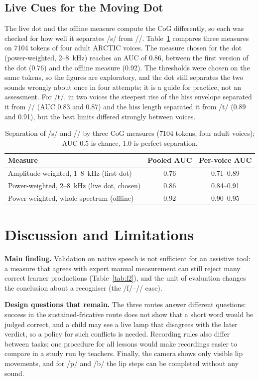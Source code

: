\documentclass[engproc,article,submit,moreauthors]{Definitions/mdpi}
\newcommand{\ipa}[1]{/#1/}
\begin{document}
\subsection{Live Cues for the Moving Dot}
The live dot and the offline measure compute the CoG differently, so each was checked for how well it separates \ipa{s} from \ipa{\textesh}. Table~\ref{tab:cog} compares three measures on 7104 tokens of four adult ARCTIC voices. The measure chosen for the dot (power-weighted, 2--8~kHz) reaches an AUC of 0.86, between the first version of the dot (0.76) and the offline measure (0.92). The thresholds were chosen on the same tokens, so the figures are exploratory, and the dot still separates the two sounds wrongly about once in four attempts: it is a guide for practice, not an assessment. For \ipa{t\textesh}, in two voices the steepest rise of the hiss envelope separated it from \ipa{\textesh} (AUC 0.83 and 0.87) and the hiss length separated it from \ipa{t} (0.89 and 0.91), but the best limits differed strongly between voices.

\begin{table}[!t]
\caption{Separation of \ipa{s} and \ipa{\textesh} by three CoG measures (7104 tokens, four adult voices); AUC 0.5 is chance, 1.0 is perfect separation.\label{tab:cog}}
\small
\begin{tabularx}{\textwidth}{Xcc}
\toprule
\textbf{Measure} & \textbf{Pooled AUC} & \textbf{Per-voice AUC}\\
\midrule
Amplitude-weighted, 1--8~kHz (first dot) & 0.76 & 0.71--0.89\\
Power-weighted, 2--8~kHz (live dot, chosen) & 0.86 & 0.84--0.91\\
Power-weighted, whole spectrum (offline) & 0.92 & 0.90--0.95\\
\bottomrule
\end{tabularx}
\end{table}

\section{Discussion and Limitations}
\textbf{Main finding.} Validation on native speech is not sufficient for an assistive tool: a measure that agrees with expert manual measurement can still reject many correct learner productions (Table~\ref{tab:l2}), and the unit of evaluation changes the conclusion about a recogniser (the \ipa{f}--\ipa{\texttheta} case).

\textbf{Design questions that remain.} The three routes answer different questions: success in the sustained-fricative route does not show that a short word would be judged correct, and a child may see a live lamp that disagrees with the later verdict, so a policy for such conflicts is needed. Recording rules also differ between tasks; one procedure for all lessons would make recordings easier to compare in a study run by teachers. Finally, the camera shows only visible lip movements, and for \ipa{p} and \ipa{b} the lip steps can be completed without any sound.
\end{document}
